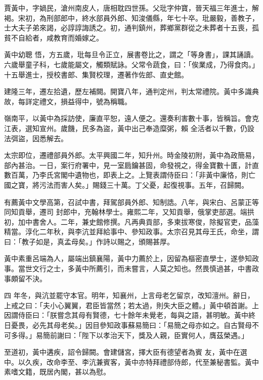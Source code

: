 \begin{pinyinscope}
 賈黃中，字媧民，滄州南皮人，唐相耽四世孫。父玭字仲寶，晉天福三年進士，解褐。宋初，為刑部郎中，終水部員外郎、知浚儀縣，年七十卒。玭嚴毅，善教子，士大夫子弟來謁，必諄諄誨誘之。初，通判鎮州，葬鄉黨群從之未葬者十五喪，孤貧不自給者，咸教育而婚嫁之。



 黃中幼聰
 悟，方五歲，玭每旦令正立，展書卷比之，謂之「等身書」，課其誦讀。六歲舉童子科，七歲能屬文，觸類賦詠。父常令蔬食，曰：「俟業成，乃得食肉。」十五舉進士，授校書郎、集賢校理，遷著作佐郎、直史館。



 建隆三年，遷左拾遺，歷左補闕。開寶八年，通判定州，判太常禮院。黃中多識典故，每詳定禮文，損益得中，號為稱職。



 嶺南平，以黃中為採訪使，廉直平恕，遠人便之。還奏利害數十事，皆稱旨。會克江表，選知宣州。歲饑，民多為盜，黃中出己奉造糜粥，賴
 全活者以千數，仍設法弭盜，因悉解去。



 太宗即位，遷禮部員外郎。太平興國二年，知升州。時金陵初附，黃中為政簡易，部內甚治。一日，案行府署中，見一室扃鑰甚固，命發視之，得金寶數十匱，計直數百萬，乃李氏宮閣中遺物也，即表上之。上覽表謂侍臣曰：「非黃中廉恪，則亡國之寶，將污法而害人矣。」賜錢三十萬。丁父憂，起復視事。五年，召歸闕。



 有薦黃中文學高第，召試中書，拜駕部員外郎、知制誥。八年，與宋白、呂蒙正等同知貢舉，遷司
 封郎中，充翰林學士。雍熙二年，又知貢舉，俄掌吏部選。端拱初，加中書舍人。二年，兼史館修撰。凡再典貢部，多柬拔寒俊，除擬官吏，品藻精當。淳化二年秋，與李沆並拜給事中、參知政事。太宗召見其母王氏，命坐，謂曰：「教子如是，真孟母矣。」作詩以賜之，頒賜甚厚。



 黃中素重呂端為人，屬端出鎮襄陽，黃中力薦於上，因留為樞密直學士，遂參知政事。當世文行之士，多黃中所薦引，而未嘗言，人莫之知也。然畏慎過甚，中書政事頗留不決。



 四
 年冬，與沆並罷守本官。明年，知襄州，上言母老乞留京，改知澶州。辭日，上戒之曰：「夫小心翼翼，君臣皆當然；若太過，則失大臣之體。」黃中頓首謝。上因謂侍臣曰：「朕嘗念其母有賢德，七十餘年未覺老，每與之語，甚明敏。黃中終日憂畏，必先其母老矣。」因目參知政事蘇易簡曰：「易簡之母亦如之。自古賢母不可多得。」易簡前謝曰：「陛下以孝治天下，獎及人親，臣實何人，膺茲榮遇。」



 至道初，黃中遘疾，詔令歸闕。會建儲宮，擇大臣有德望者為賓
 友，黃中在選中。以久疾，改命李至、李沆兼賓客，黃中亦特拜禮部侍郎，代至兼秘書監。黃中素嗜文籍，既居內閣，甚以為慰。




\end{pinyinscope}
